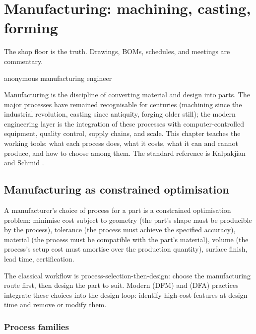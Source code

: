 \chapter{Manufacturing: machining, casting, forming}
\label{vol08:ch06}

\epigraph{The shop floor is the truth. Drawings, BOMs, schedules, and meetings are commentary.}{anonymous manufacturing engineer}


\noindent
Manufacturing is the discipline of converting material and design into parts. The major processes have remained recognisable for centuries (machining since the industrial revolution, casting since antiquity, forging older still); the modern engineering layer is the integration of these processes with computer-controlled equipment, quality control, supply chains, and scale. This chapter teaches the working tools: what each process does, what it costs, what it can and cannot produce, and how to choose among them. The standard reference is Kalpakjian and Schmid \cite{text:kalpakjian-manufacturing}.

\section{Manufacturing as constrained optimisation}

A manufacturer's choice of process for a part is a constrained optimisation problem: minimise cost subject to geometry (the part's shape must be producible by the process), tolerance (the process must achieve the specified accuracy), material (the process must be compatible with the part's material), volume (the process's setup cost must amortise over the production quantity), surface finish, lead time, certification.

The classical workflow is process-selection-then-design: choose the manufacturing route first, then design the part to suit. Modern  (DFM) and  (DFA) practices integrate these choices into the design loop: identify high-cost features at design time and remove or modify them.

\subsection{Process families}

